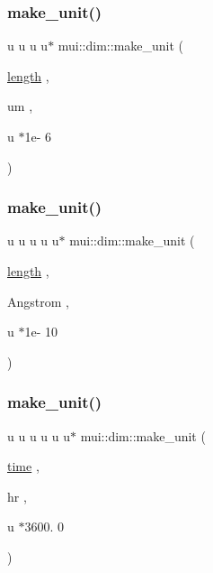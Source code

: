 \mbox{\label{namespacemui_1_1dim_a57c28639a26b227855cce024cbb3a3b6}} 
\subsubsection{\texorpdfstring{make\+\_\+unit()}{make\_unit()}\hspace{0.1cm}{\footnotesize\ttfamily [5/32]}}
{\footnotesize\ttfamily u u u u$\ast$ mui\+::dim\+::make\+\_\+unit (\begin{DoxyParamCaption}\item[{\hyperlink{namespacemui_1_1dim_ade9a9679bc46e16322ef419974faebe6}{length}}]{,  }\item[{um}]{,  }\item[{u $\ast$1e-\/}]{6 }\end{DoxyParamCaption})}

\mbox{\label{namespacemui_1_1dim_a23033b8d420d5c889c3198fe37026507}} 
\subsubsection{\texorpdfstring{make\+\_\+unit()}{make\_unit()}\hspace{0.1cm}{\footnotesize\ttfamily [6/32]}}
{\footnotesize\ttfamily u u u u u$\ast$ mui\+::dim\+::make\+\_\+unit (\begin{DoxyParamCaption}\item[{\hyperlink{namespacemui_1_1dim_ade9a9679bc46e16322ef419974faebe6}{length}}]{,  }\item[{Angstrom}]{,  }\item[{u $\ast$1e-\/}]{10 }\end{DoxyParamCaption})}

\mbox{\label{namespacemui_1_1dim_abe764645bff0d3068e8a00eec2e03243}} 
\subsubsection{\texorpdfstring{make\+\_\+unit()}{make\_unit()}\hspace{0.1cm}{\footnotesize\ttfamily [7/32]}}
{\footnotesize\ttfamily u u u u u u$\ast$ mui\+::dim\+::make\+\_\+unit (\begin{DoxyParamCaption}\item[{\hyperlink{namespacemui_1_1dim_a3d3a0014025f1c2c0dd7418791928500}{time}}]{,  }\item[{hr}]{,  }\item[{u $\ast$3600.}]{0 }\end{DoxyParamCaption})}

